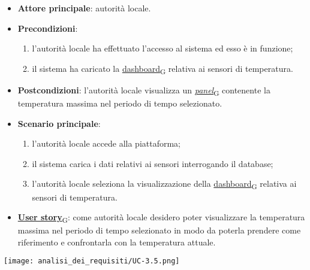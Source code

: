 \begin{itemize}
	\item \textbf{Attore principale}: autorità locale.
	\item \textbf{Precondizioni}:
	      \begin{enumerate}
		      \item l'autorità locale ha effettuato l'accesso al sistema ed esso è in funzione;
		      \item il sistema ha caricato la \href{https://7last.github.io/docs/pb/documentazione-interna/glossario\#dashboard}{dashboard\textsubscript{G}} relativa ai sensori di temperatura.
	      \end{enumerate}
	\item \textbf{Postcondizioni}: l'autorità locale visualizza un \href{https://7last.github.io/docs/pb/documentazione-interna/glossario\#panel}{\textit{panel}\textsubscript{G}} contenente la temperatura massima nel periodo di tempo selezionato.
	\item \textbf{Scenario principale}:
	      \begin{enumerate}
		      \item l'autorità locale accede alla piattaforma;
		      \item il sistema carica i dati relativi ai sensori interrogando il database;
		      \item l'autorità locale seleziona la visualizzazione della \href{https://7last.github.io/docs/pb/documentazione-interna/glossario\#dashboard}{dashboard\textsubscript{G}} relativa ai sensori di temperatura.
	      \end{enumerate}
	\item \href{https://7last.github.io/docs/pb/documentazione-interna/glossario\#user-story}{\textbf{User story}\textsubscript{G}}:
	      come autorità locale desidero poter visualizzare la temperatura massima nel periodo di tempo selezionato
	      in modo da poterla prendere come riferimento e confrontarla con la temperatura attuale.
\end{itemize}
\begin{center}
	\texttt{[image: analisi\_dei\_requisiti/UC-3.5.png]}
\end{center}


